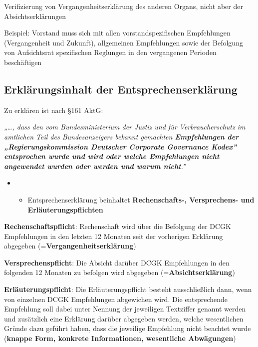 \documentclass[
]{article}
\providecommand{\tightlist}{%
  \setlength{\itemsep}{0pt}\setlength{\parskip}{0pt}}
\begin{document}
Verifizierung von Vergangenheitserklärung des anderen Organs, nicht aber
der Absichtserklärungen

Beispiel: Vorstand muss sich mit allen vorstandspezifischen Empfehlungen
(Vergangenheit und Zukunft), allgemeinen Empfehlungen sowie der
Befolgung von Aufsichtsrat spezifischen Reglungen in den vergangenen
Perioden beschäftigen

\hypertarget{erkluxe4rungsinhalt-der-entsprechenserkluxe4rung}{%
\subsection{Erklärungsinhalt der
Entsprechenserklärung}\label{erkluxe4rungsinhalt-der-entsprechenserkluxe4rung}}

Zu erklären ist nach §161 AktG:

\emph{„\ldots, dass den vom Bundesministerium der Justiz und für
Verbraucherschutz im amtlichen Teil des Bundesanzeigers bekannt
gemachten \textbf{Empfehlungen der „Regierungskommission Deutscher
Corporate Governance Kodex'' entsprochen wurde und wird oder welche
Empfehlungen nicht angewendet wurden oder werden und warum nicht}.''}

\begin{itemize}
\item
  \begin{itemize}
  \tightlist
  \item
    Entsprechenserklärung beinhaltet \textbf{Rechenschafts-,
    Versprechens- und Erläuterungspflichten}
  \end{itemize}
\end{itemize}

\textbf{Rechenschaftspflicht}: Rechenschaft wird über die Befolgung der
DCGK Empfehlungen in den letzten 12 Monaten seit der vorherigen
Erklärung abgegeben (=\textbf{Vergangenheitserklärung})

\textbf{Versprechenspflicht}: Die Absicht darüber DCGK Empfehlungen in
den folgenden 12 Monaten zu befolgen wird abgegeben
(=\textbf{Absichtserklärung})

\textbf{Erläuterungspflicht}: Die Erläuterungspflicht besteht
ausschließlich dann, wenn von einzelnen DCGK Empfehlungen abgewichen
wird. Die entsprechende Empfehlung soll dabei unter Nennung der
jeweiligen Textziffer genannt werden und zusätzlich eine Erklärung
darüber abgegeben werden, welche wesentlichen Gründe dazu geführt haben,
dass die jeweilige Empfehlung nicht beachtet wurde (\textbf{knappe Form,
konkrete Informationen, wesentliche Abwägungen})
\end{document}
